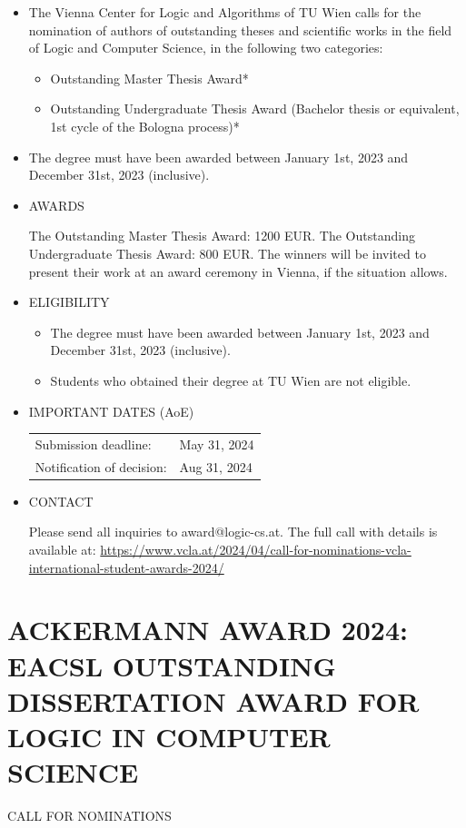 \documentclass[prodmode,acmtecs]{acmsmall} %
\begin{document}
\begin{itemize}\item  The Vienna Center for Logic and Algorithms of TU Wien calls for the nomination of authors of outstanding theses and scientific works in the field of Logic and Computer Science, in the following two categories: 
 
\begin{itemize}\item  Outstanding Master Thesis Award*
\item  Outstanding Undergraduate Thesis Award (Bachelor thesis or equivalent, 1st cycle of the Bologna process)*
\end{itemize} 
\item  The degree must have been awarded between January 1st, 2023 and December 31st, 2023 (inclusive). 
 
\item  AWARDS 
 
  The Outstanding Master Thesis Award: 1200 EUR. The Outstanding Undergraduate Thesis Award: 800 EUR. The winners will be invited to present their work at an award ceremony in Vienna, if the situation allows. 
 
\item  ELIGIBILITY 
 
\begin{itemize}\item  The degree must have been awarded between January 1st, 2023 and December 31st, 2023 (inclusive).
\item  Students who obtained their degree at TU Wien are not eligible.
\end{itemize} 
\item  IMPORTANT DATES (AoE) 
 
\begin{tabulary}{\linewidth}{LL}Submission deadline:  & May 31, 2024 \\
Notification of decision:  & Aug 31, 2024 \\
\end{tabulary}
 
\item  CONTACT 
 
  Please send all inquiries to award@logic-cs.at. The full call with details is available at: \href{https://www.vcla.at/2024/04/call-for-nominations-vcla-international-student-awards-2024/}{https://www.vcla.at/2024/04/call-for-nominations-vcla-international-student-awards-2024/} 
 
\end{itemize}\section{ACKERMANN AWARD 2024: EACSL OUTSTANDING DISSERTATION AWARD FOR LOGIC IN COMPUTER SCIENCE}\label{ACKERMANNAWARD2024}CALL FOR NOMINATIONS 
\end{document}
